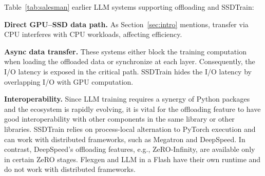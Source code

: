 Table~\ref{tab:salesman}  earlier LLM systems supporting  offloading and SSDTrain:

\noindent
\textbf{Direct GPU--SSD data path.} As Section~\ref{sec:intro} mentions, transfer via CPU interferes with CPU workloads, affecting efficiency. 

\noindent
\textbf{Async data transfer.} These systems either block the training computation when loading the offloaded data or synchronize at each layer. Consequently, the I/O latency is exposed in the critical path. SSDTrain hides the I/O latency by overlapping I/O with GPU computation. 

\noindent
\textbf{Interoperability.} Since LLM training requires a synergy of Python packages and the ecosystem is rapidly evolving, it is vital for the offloading feature to have good interoperability with other components in the same library or other libraries. SSDTrain relies on process-local alternation to PyTorch execution and can work with distributed frameworks, such as Megatron and DeepSpeed. In contrast, DeepSpeed's offloading features, e.g., ZeRO-Infinity, are available only in certain ZeRO stages.  Flexgen and LLM in a Flash have their own runtime and do not work with distributed frameworks. 





